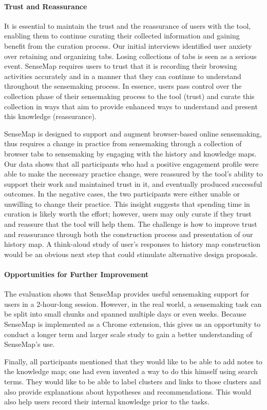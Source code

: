 \paragraph{Trust and Reassurance}
It is essential to maintain the trust and the reassurance of users with the tool, enabling them to continue curating their collected information and gaining benefit from the curation process. Our initial interviews identified user anxiety over retaining and organizing tabs. Losing collections of tabs is seen as a serious event. SenseMap requires users to trust that it is recording their browsing activities accurately and in a manner that they can continue to understand throughout the sensemaking process. In essence, users pass control over the collection phase of their sensemaking process to the tool (trust) and curate this collection in ways that aim to provide enhanced ways to understand and present this knowledge (reassurance).

SenseMap is designed to support and augment browser-based online sensemaking, thus requires a change in practice from sensemaking through a collection of browser tabs to sensemaking by engaging with the history and knowledge maps. Our data shows that all participants who had a positive engagement profile were able to make the necessary practice change, were reassured by the tool's ability to support their work and maintained trust in it, and eventually produced successful outcomes. In the negative cases, the two participants were either unable or unwilling to change their practice. This insight suggests that spending time in curation is likely worth the effort; however, users may only curate if they trust and reassure that the tool will help them. The challenge is how to improve trust and reassurance through both the construction process and presentation of our history map. A think-aloud study of user's responses to history map construction would be an obvious next step that could stimulate alternative design proposals.

\paragraph{Opportunities for Further Improvement}
The evaluation shows that SenseMap provides useful sensemaking support for users in a 2-hour-long session. However, in the real world, a sensemaking task can be split  into small chunks and spanned multiple days or even weeks. Because SenseMap is implemented as a Chrome extension, this gives us an opportunity to conduct a longer term and larger scale study to gain a better understanding of SenseMap's use.

Finally, all participants mentioned that they would like to be able to add notes to the knowledge map; one had even invented a way to do this himself using search terms. They would like to be able to label clusters and links to those clusters and also provide explanations about hypotheses and recommendations. This would also help users record their internal knowledge prior to the tasks.